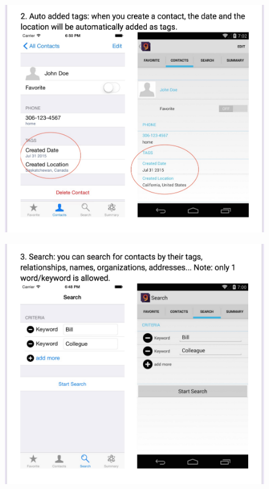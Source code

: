 \documentclass{uofsthesis-cs}
\begin{document}
\begin{figure}[!h]
\begin{center}
\includegraphics[scale=0.4]{pics/survey2.png}
\end{center}
\end{figure}

\begin{figure}[!h]
\begin{center}
\includegraphics[scale=0.4]{pics/survey3.png}
\end{center}
\end{figure}
\end{document}
